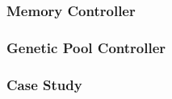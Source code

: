 \subsubsection{Memory Controller} \label{fpga:fitness:sss:memory_controller}

\subsubsection{Genetic Pool Controller} \label{fpga:fitness:sss:genetic_pool_controller}

\subsubsection{Case Study} \label{fpga:fitness:sss:case_study}




